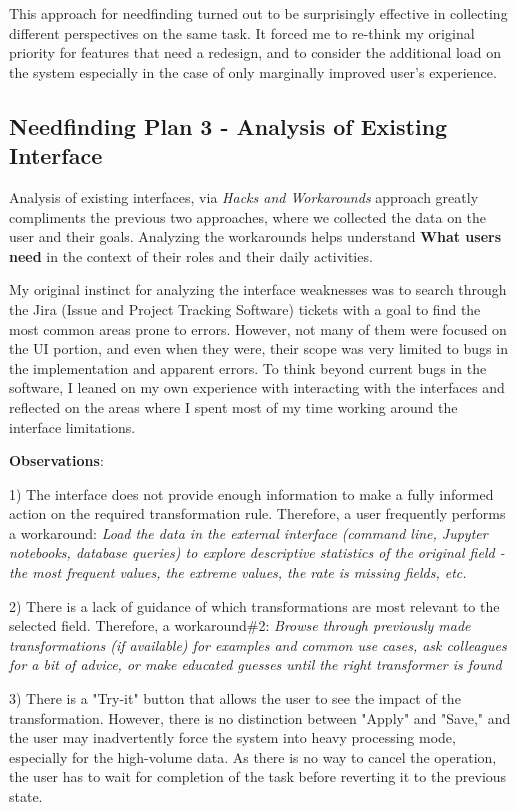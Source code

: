 \documentclass[12pt,letterpaper]{article}
\begin{document}
This approach for needfinding turned out to be surprisingly effective in collecting different perspectives on the same task. It forced me to re-think my original priority for features that need a redesign, and to consider the additional load on the system especially in the case of only marginally improved user's experience. 


\subsection*{Needfinding Plan 3 - Analysis of Existing Interface}
Analysis of existing interfaces, via \textit{Hacks and Workarounds} approach greatly compliments the previous two approaches, where we collected the data on the user and their goals. Analyzing the workarounds helps understand \textbf{What users need} in the context of their roles and their daily activities. 

My original instinct for analyzing the interface weaknesses was to search through the Jira (Issue and Project Tracking Software) tickets with a goal to find the most common areas prone to errors. However, not many of them were focused on the UI portion, and even when they were, their scope was very limited to bugs in the implementation and apparent errors. To think beyond current bugs in the software, I leaned on my own experience with interacting with the interfaces and reflected on the areas where I spent most of my time working around the interface limitations.  

\textbf{Observations}:

1) The interface does not provide enough information to make a fully informed action on the required transformation rule. Therefore, a user frequently performs a workaround: \textit{Load the data in the external interface (command line, Jupyter notebooks, database queries) to explore descriptive statistics of the original field - the most frequent values,  the extreme values, the rate is missing fields, etc.}

2) There is a lack of guidance of which transformations are most relevant to the selected field. Therefore, a workaround\#2: \textit{Browse through previously made transformations (if available) for examples and common use cases, ask colleagues for a bit of advice, or make educated guesses until the right transformer is found}

3) There is a "Try-it" button that allows the user to see the impact of the transformation. However, there is no distinction between "Apply" and "Save," and the user may inadvertently force the system into heavy processing mode, especially for the high-volume data.  As there is no way to cancel the operation, the user has to wait for completion of the task before reverting it to the previous state.
\end{document}
